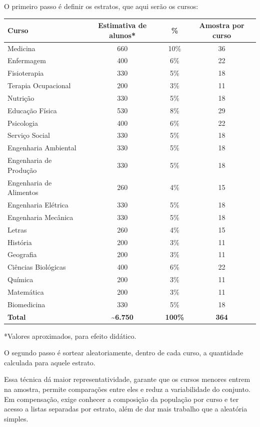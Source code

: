 \documentclass[
]{book}
\newcounter{none} %
\begin{document}
O primeiro passo é definir os estratos, que aqui serão os cursos:

{\def\LTcaptype{none} %
\begin{longtable}[]{@{}lccc@{}}
\toprule\noalign{}
Curso & Estimativa de alunos* & \% & Amostra por curso \\
\midrule\noalign{}
\endhead
\bottomrule\noalign{}
\endlastfoot
Medicina & 660 & 10\% & 36 \\
Enfermagem & 400 & 6\% & 22 \\
Fisioterapia & 330 & 5\% & 18 \\
Terapia Ocupacional & 200 & 3\% & 11 \\
Nutrição & 330 & 5\% & 18 \\
Educação Física & 530 & 8\% & 29 \\
Psicologia & 400 & 6\% & 22 \\
Serviço Social & 330 & 5\% & 18 \\
Engenharia Ambiental & 330 & 5\% & 18 \\
Engenharia de Produção & 330 & 5\% & 18 \\
Engenharia de Alimentos & 260 & 4\% & 15 \\
Engenharia Elétrica & 330 & 5\% & 18 \\
Engenharia Mecânica & 330 & 5\% & 18 \\
Letras & 260 & 4\% & 15 \\
História & 200 & 3\% & 11 \\
Geografia & 200 & 3\% & 11 \\
Ciências Biológicas & 400 & 6\% & 22 \\
Química & 200 & 3\% & 11 \\
Matemática & 200 & 3\% & 11 \\
Biomedicina & 330 & 5\% & 18 \\
\textbf{Total} & \textbf{\textasciitilde6.750} & \textbf{100\%} & \textbf{364} \\
\end{longtable}
}

*Valores aproximados, para efeito didático.

O segundo passo é sortear aleatoriamente, dentro de cada curso, a quantidade calculada para aquele estrato.

Essa técnica dá maior representatividade, garante que os cursos menores entrem na amostra, permite comparações entre eles e reduz a variabilidade do conjunto. Em compensação, exige conhecer a composição da população por curso e ter acesso a listas separadas por estrato, além de dar mais trabalho que a aleatória simples.
\end{document}
